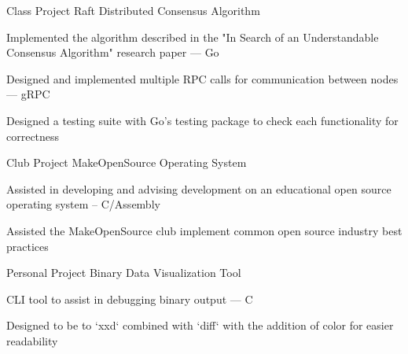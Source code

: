 

\begin{cventries}

  \cventry
    {Class Project} %
    {Raft Distributed Consensus Algorithm} %
    {} %
    {} %
    {
      \begin{cvitems} %
        \item Implemented the algorithm described in the "In Search of an Understandable Consensus Algorithm" research paper --- Go 
	\item Designed and implemented multiple RPC calls for communication between nodes --- gRPC
    \item Designed a testing suite with Go's testing package to check each functionality for correctness
      \end{cvitems}
    }


  \cventry
    {Club Project} %
    {MakeOpenSource Operating System} %
    {} %
    {} %
    {
      \begin{cvitems} %
        \item Assisted in developing and advising development on an educational open source operating system -- C/Assembly
        \item Assisted the MakeOpenSource club implement common open source industry best practices
      \end{cvitems}
    }
  \cventry
    {Personal Project} %
    {Binary Data Visualization Tool} %
    {} %
    {} %
    {
      \begin{cvitems} %
        \item CLI tool to assist in debugging binary output --- C
        \item Designed to be to `xxd` combined with `diff` with the addition of color for easier readability
      \end{cvitems}
    }



\end{cventries}
